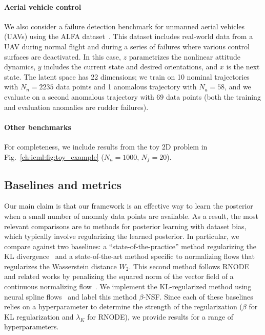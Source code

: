 \paragraph{Aerial vehicle control} We also consider a failure detection benchmark for unmanned aerial vehicles (UAVs) using the ALFA dataset~\cite{keipourALFADatasetUAV2021}. This dataset includes real-world data from a UAV during normal flight and during a series of failures where various control surfaces are deactivated. In this case, $z$ parametrizes the nonlinear attitude dynamics, $y$ includes the current state and desired orientations, and $x$ is the next state. The latent space has 22 dimensions; we train on 10 nominal trajectories with $N_n = 2235$ data points and 1 anomalous trajectory with $N_a = 58$, and we evaluate on a second anomalous trajectory with $69$ data points (both the training and evaluation anomalies are rudder failures).

\paragraph{Other benchmarks} For completeness, we include results from the toy 2D problem in Fig.~\ref{ch:icml:fig:toy_example} ($N_n = 1000$, $N_f = 20$).

\subsection{Baselines and metrics}

Our main claim is that our \ouralg{} framework is an effective way to learn the posterior when a small number of anomaly data points are available. As a result, the most relevant comparisons are to methods for posterior learning with dataset bias, which typically involve regularizing the learned posterior. In particular, we compare against two baselines: a ``state-of-the-practice'' method regularizing the KL divergence~\cite{asimInvertibleGenerativeModels2020,higginsBetaVAELearningBasic2016} and a state-of-the-art method specific to normalizing flows that regularizes the Wasserstein distance $W_2$. This second method follows RNODE and related works by penalizing the squared norm of the vector field of a continuous normalizing flow~\cite{finlayHowTrainYour2020,onkenOTFlowFastAccurate2021}. We implement the KL-regularized method using neural spline flows~\cite{durkanNeuralSplineFlows2019} and label this method $\beta$-NSF. Since each of these baselines relies on a hyperparameter to determine the strength of the regularization ($\beta$ for KL regularization and $\lambda_K$ for RNODE), we provide results for a range of hyperparameters.

